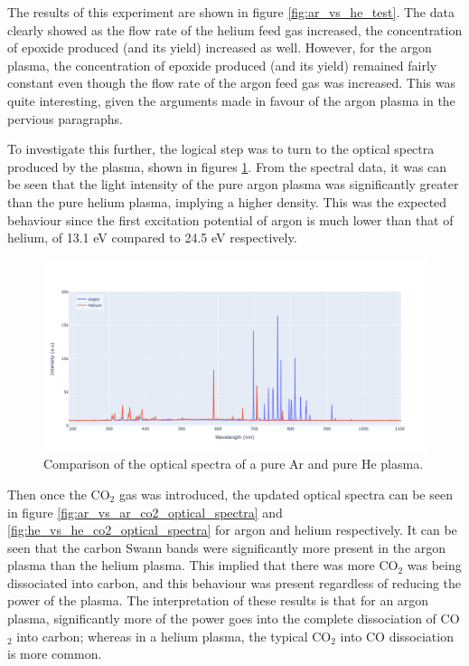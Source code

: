 The results of this experiment are shown in figure \ref{fig:ar_vs_he_test}. The data clearly showed as the flow rate of the helium feed gas increased, the concentration of epoxide produced (and its yield) increased as well. However, for the argon plasma, the concentration of epoxide produced (and its yield) remained fairly constant even though the flow rate of the argon feed gas was increased. This was quite interesting, given the arguments made in favour of the argon plasma in the pervious paragraphs.

To investigate this further, the logical step was to turn to the optical spectra produced by the plasma, shown in figures \ref{fig:ar_vs_he_optical_spectra}. From the spectral data, it was can be seen that the light intensity of the pure argon plasma was significantly greater than the pure helium plasma, implying a higher density. This was the expected behaviour since the first excitation potential of argon is much lower than that of helium, of 13.1 eV compared to 24.5 eV respectively.

\begin{figure}[h!]
	\centering
    \includegraphics[width=\linewidth]{chapter_6/figures/ar_vs_he_optical_spectra.png} 
	\caption{Comparison of the optical spectra of a pure Ar and pure He plasma.}
	\label{fig:ar_vs_he_optical_spectra}
\end{figure} 

Then once the CO$_2$ gas was introduced, the updated optical spectra can be seen in figure \ref{fig:ar_vs_ar_co2_optical_spectra} and \ref{fig:he_vs_he_co2_optical_spectra} for argon and helium respectively. It can be seen that the carbon Swann bands were significantly more present in the argon plasma than the helium plasma. This implied that there was more CO$_2$ was being dissociated into carbon, and this behaviour was present regardless of reducing the power of the plasma. The interpretation of these results is that for an argon plasma, significantly more of the power goes into the complete dissociation of CO$_2$ into carbon; whereas in a helium plasma, the typical CO$_2$ into CO dissociation is more common.  

